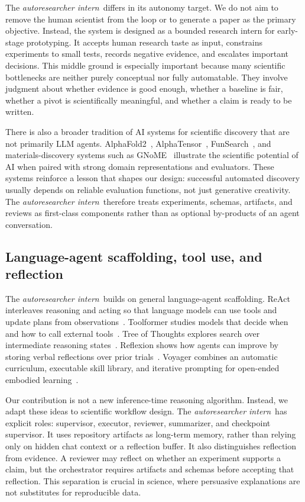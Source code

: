 \documentclass{article}
\newcommand{\intern}{\emph{autoresearcher intern}}
\begin{document}
The \intern\ differs in its autonomy target. We do not aim to remove the human scientist from the loop or to generate a paper as the primary objective. Instead, the system is designed as a bounded research intern for early-stage prototyping. It accepts human research taste as input, constrains experiments to small tests, records negative evidence, and escalates important decisions. This middle ground is especially important because many scientific bottlenecks are neither purely conceptual nor fully automatable. They involve judgment about whether evidence is good enough, whether a baseline is fair, whether a pivot is scientifically meaningful, and whether a claim is ready to be written.

There is also a broader tradition of AI systems for scientific discovery that are not primarily LLM agents. AlphaFold2~\citep{jumper2021alphafold}, AlphaTensor~\citep{fawzi2022alphatensor}, FunSearch~\citep{romeraparedes2024funsearch}, and materials-discovery systems such as GNoME~\citep{merchant2023gnome} illustrate the scientific potential of AI when paired with strong domain representations and evaluators. These systems reinforce a lesson that shapes our design: successful automated discovery usually depends on reliable evaluation functions, not just generative creativity. The \intern\ therefore treats experiments, schemas, artifacts, and reviews as first-class components rather than as optional by-products of an agent conversation.

\subsection{Language-agent scaffolding, tool use, and reflection}

The \intern\ builds on general language-agent scaffolding. ReAct interleaves reasoning and acting so that language models can use tools and update plans from observations~\citep{yao2022react}. Toolformer studies models that decide when and how to call external tools~\citep{schick2023toolformer}. Tree of Thoughts explores search over intermediate reasoning states~\citep{yao2023tree}. Reflexion shows how agents can improve by storing verbal reflections over prior trials~\citep{shinn2023reflexion}. Voyager combines an automatic curriculum, executable skill library, and iterative prompting for open-ended embodied learning~\citep{wang2023voyager}.

Our contribution is not a new inference-time reasoning algorithm. Instead, we adapt these ideas to scientific workflow design. The \intern\ has explicit roles: supervisor, executor, reviewer, summarizer, and checkpoint supervisor. It uses repository artifacts as long-term memory, rather than relying only on hidden chat context or a reflection buffer. It also distinguishes reflection from evidence. A reviewer may reflect on whether an experiment supports a claim, but the orchestrator requires artifacts and schemas before accepting that reflection. This separation is crucial in science, where persuasive explanations are not substitutes for reproducible data.
\end{document}
